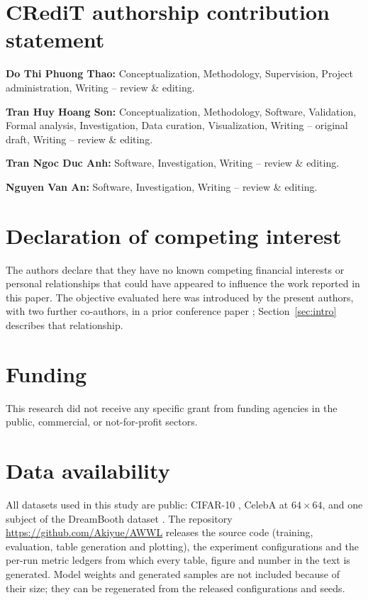 
\section*{CRediT authorship contribution statement}
\noindent\textbf{Do Thi Phuong Thao:} Conceptualization, Methodology, Supervision,
Project administration, Writing -- review \& editing.

\noindent\textbf{Tran Huy Hoang Son:} Conceptualization, Methodology, Software,
Validation, Formal analysis, Investigation, Data curation, Visualization,
Writing -- original draft, Writing -- review \& editing.

\noindent\textbf{Tran Ngoc Duc Anh:} Software, Investigation, Writing -- review \&
editing.

\noindent\textbf{Nguyen Van An:} Software, Investigation, Writing -- review \& editing.

\section*{Declaration of competing interest}
The authors declare that they have no known competing financial interests or
personal relationships that could have appeared to influence the work reported
in this paper. The objective evaluated here was introduced by the present
authors, with two further co-authors, in a prior conference paper
\citep{thao2026awwl};
Section~\ref{sec:intro} describes that relationship.

\section*{Funding}
This research did not receive any specific grant from funding agencies in
the public, commercial, or not-for-profit sectors.

\section*{Data availability}
All datasets used in this study are public: CIFAR-10
\citep{krizhevsky2009learning}, CelebA \citep{liu2015deep} at $64\times64$,
and one subject of the DreamBooth dataset \citep{ruiz2023dreambooth}. The
repository \url{https://github.com/Akiyue/AWWL} releases the source code
(training, evaluation, table generation and plotting), the experiment
configurations and the per-run metric ledgers from which every table, figure
and number in the text is generated.
Model weights and generated
samples are not included because of their size; they can be regenerated from
the released configurations and seeds.

